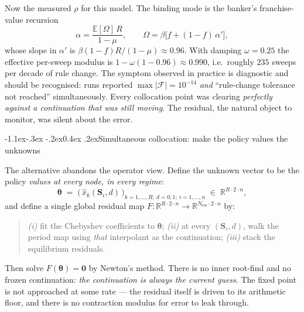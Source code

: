 \documentclass[10pt,a4paper]{article}
\makeatletter
\theoremstyle{definition}
\theoremstyle{plain}
\theoremstyle{remark}
\newcommand{\R}{\mathbb{R}}
\newcommand{\E}{\mathbb{E}}
\newcommand{\st}{\mathbf{S}}
\newcommand{\pol}{\bm{\theta}}
\renewcommand\subsection{\@startsection{subsection}{2}{\z@}%
  {-1.1ex\@plus -.3ex \@minus -.2ex}{0.4ex \@plus .2ex}{\normalfont\normalsize\bfseries}}
\makeatother
\begin{document}
Now the measured $\rho$ for this model. The binding mode is the banker's franchise-value
recursion
\begin{equation}
  \alpha = \frac{\E[\Omega]\,R}{1-\mu},\qquad \Omega = \beta\big[f + (1-f)\,\alpha'\big],
\end{equation}
whose slope in $\alpha'$ is $\beta(1-f)R/(1-\mu) \approx 0.96$. With damping $\omega=0.25$
the effective per-sweep modulus is $1-\omega(1-0.96) \approx 0.990$, i.e.\ roughly $235$
sweeps per decade of rule change. The symptom observed in practice is diagnostic and should
be recognised: runs reported $\max|\mathcal{F}| = 10^{-14}$ \emph{and} ``rule-change tolerance
not reached'' simultaneously. Every collocation point was clearing \emph{perfectly against a
continuation that was still moving}. The residual, the natural object to monitor, was
silent about the error.

\subsection{Simultaneous collocation: make the policy values the unknowns}

The alternative abandons the operator view. Define the unknown vector to be the policy
\emph{values at every node, in every regime}:
\begin{equation}
  \pol \;=\; \Big(\,\hat x_{k}(\st_i,d)\,\Big)_{k=1,\dots,R;\ d=0,1;\ i=1,\dots,n} \;\in\; \R^{R\cdot 2\cdot n},
\end{equation}
and define a single global residual map $F : \R^{R\cdot2\cdot n}\to\R^{N_{\mathrm{res}}\cdot2\cdot n}$ by:
\begin{quote}
\emph{(i)} fit the Chebyshev coefficients to $\pol$; \emph{(ii)} at every $(\st_i,d)$, walk
the period map using \emph{that} interpolant as the continuation; \emph{(iii)} stack the
equilibrium residuals.
\end{quote}
Then solve $F(\pol)=\bm 0$ by Newton's method. There is no inner root-find and no frozen
continuation: \emph{the continuation is always the current guess}. The fixed point is not
approached at some rate --- the residual itself is driven to its arithmetic floor, and there
is no contraction modulus for error to leak through.
\end{document}
